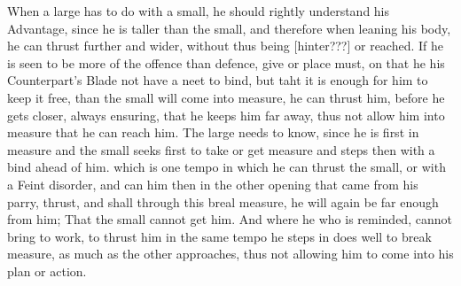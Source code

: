 When a large has to do with a small, he should rightly understand his
Advantage, since he is taller than the small, and therefore when
leaning his body, he can thrust further and wider, without thus being
[hinter???] or reached.
If he is seen to be more of the offence than defence, give or place
must, on that he his Counterpart's Blade not have a neet to bind, but
taht it is enough for him to keep it free, 
than the small will come into measure, he can thrust him, before he
gets closer, always ensuring, that he keeps him far away, thus not
allow him into measure that he can reach him. The large needs to know,
since he is first in measure and the small seeks first to take or get
measure and steps then with a bind ahead of him.
which is one tempo in which he can thrust the small, or with a Feint
disorder, and can him then in the other opening that came from his parry,
thrust, and shall through this breal measure, he will again be far
enough from him;
That the small cannot get him. And where he who is reminded, cannot
bring to work, to thrust him in the same tempo he steps in does well
to break measure, as much as the other approaches, thus not allowing
him to come into his plan or action.

